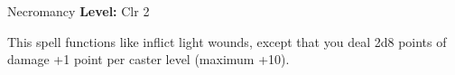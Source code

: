 {Necromancy}
{
	\textbf{Level:}
	Clr 2\\
}
{
	This spell functions like inflict light wounds, except that you deal 2d8 points of damage +1 point per caster level (maximum +10).

}
